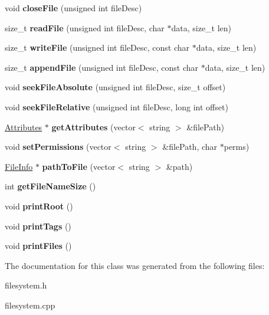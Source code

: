 \begin{DoxyCompactItemize}
void {\bfseries close\+File} (unsigned int file\+Desc)
\item 
\mbox{\label{classFileSystem_ae8d0b2314a26136a09e2edceab68fae1}} 
size\+\_\+t {\bfseries read\+File} (unsigned int file\+Desc, char $\ast$data, size\+\_\+t len)
\item 
\mbox{\label{classFileSystem_ad8f59355b3eec94ee8fb88acb4179c69}} 
size\+\_\+t {\bfseries write\+File} (unsigned int file\+Desc, const char $\ast$data, size\+\_\+t len)
\item 
\mbox{\label{classFileSystem_a34ef1d823d338aa7190a4acf137a015d}} 
size\+\_\+t {\bfseries append\+File} (unsigned int file\+Desc, const char $\ast$data, size\+\_\+t len)
\item 
\mbox{\label{classFileSystem_ae7e60d804eddbb5552cbbcec3d48483e}} 
void {\bfseries seek\+File\+Absolute} (unsigned int file\+Desc, size\+\_\+t offset)
\item 
\mbox{\label{classFileSystem_a9b45f5de73ca363309cbfdbecc37df9a}} 
void {\bfseries seek\+File\+Relative} (unsigned int file\+Desc, long int offset)
\item 
\mbox{\label{classFileSystem_aa95e4a2637d1aaca39f1672fc98345b5}} 
\mbox{\hyperlink{classAttributes}{Attributes}} $\ast$ {\bfseries get\+Attributes} (vector$<$ string $>$ \&file\+Path)
\item 
\mbox{\label{classFileSystem_ab4d83c124999807d6ea9ff76e95dac06}} 
void {\bfseries set\+Permissions} (vector$<$ string $>$ \&file\+Path, char $\ast$perms)
\item 
\mbox{\label{classFileSystem_a33e11c3a6b9eeda2e85c8e61b50ddeed}} 
\mbox{\hyperlink{classFileInfo}{File\+Info}} $\ast$ {\bfseries path\+To\+File} (vector$<$ string $>$ \&path)
\item 
\mbox{\label{classFileSystem_a4c23a9aab388ac27008682e3977672e3}} 
int {\bfseries get\+File\+Name\+Size} ()
\item 
\mbox{\label{classFileSystem_af6adc05d57f715de07432a897070eec4}} 
void {\bfseries print\+Root} ()
\item 
\mbox{\label{classFileSystem_a4caa6452a78caf023ff522c5846f1391}} 
void {\bfseries print\+Tags} ()
\item 
\mbox{\label{classFileSystem_a0bc788485811b7307193ee282ff5ba53}} 
void {\bfseries print\+Files} ()
\end{DoxyCompactItemize}


The documentation for this class was generated from the following files\+:\begin{DoxyCompactItemize}
\item 
filesystem.\+h\item 
filesystem.\+cpp\end{DoxyCompactItemize}
